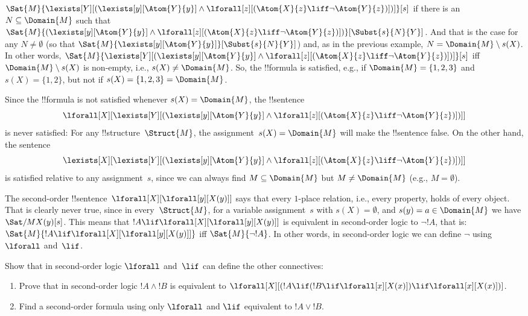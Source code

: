\documentclass[../../../include/open-logic-section]{subfiles}
\begin{document}
\begin{ex}
  $\Sat{M}{\lexists[Y][(\lexists[y][\Atom{Y}{y}] \land
  \lforall[z][(\Atom{X}{z} \liff \lnot \Atom{Y}{z})])]}[s]$ if there
  is an $N \subseteq \Domain{M}$ such that
  $\Sat{M}{(\lexists[y][\Atom{Y}{y}] \land \lforall[z][(\Atom{X}{z}
  \liff \lnot \Atom{Y}{z})])}[\Subst{s}{N}{Y}]$. And that is the case
  for any $N \neq \emptyset$ (so that
  $\Sat{M}{\lexists[y][\Atom{Y}{y}]}[\Subst{s}{N}{Y}]$) and, as in the
  previous example, $N = \Domain{M} \setminus s(X)$. In other words,
  $\Sat{M}{\lexists[Y][(\lexists[y][\Atom{Y}{y}] \land
  \lforall[z][(\Atom{X}{z} \liff \lnot \Atom{Y}{z})])]}[s]$ iff
  $\Domain{M} \setminus s(X)$ is non-empty, i.e., $s(X) \neq
  \Domain{M}$. So, the !!{formula} is satisfied, e.g., if $\Domain{M}
  = \{1, 2, 3\}$ and $s(X) = \{1, 2\}$, but not if $s(X) = \{1, 2, 3\}
  = \Domain{M}$.

  Since the !!{formula} is not satisfied whenever $s(X) = \Domain{M}$,
  the !!{sentence}
  \[
  \lforall[X][\lexists[Y][(\lexists[y][\Atom{Y}{y}] \land
      \lforall[z][(\Atom{X}{z} \liff \lnot \Atom{Y}{z})])]]
  \]
  is never satisfied: For any !!{structure}~$\Struct{M}$, the
  assignment~$s(X) = \Domain{M}$ will make the !!{sentence} false. On
  the other hand, the sentence
  \[
  \lexists[X][\lexists[Y][(\lexists[y][\Atom{Y}{y}] \land
      \lforall[z][(\Atom{X}{z} \liff \lnot \Atom{Y}{z})])]]
  \]
  is satisfied relative to any assignment~$s$, since we can always
  find $M \subseteq \Domain{M}$ but $M \neq \Domain{M}$ (e.g., $M = \emptyset$).
\end{ex}

\begin{ex}
  The second-order !!{sentence}~$\lforall[X][\lforall[y][X(y)]]$ says
  that every $1$-place relation, i.e., every property, holds of every
  object. That is clearly never true, since in every~$\Struct{M}$, for
  a variable assignment~$s$ with $s(X) = \emptyset$, and $s(y) = a \in
  \Domain{M}$ we have $\Sat/{M}{X(y)}[s]$. This means that $!A \lif
  \lforall[X][\lforall[y][X(y)]]$ is equivalent in second-order logic
  to $\lnot !A$, that is: $\Sat{M}{!A \lif
  \lforall[X][\lforall[y][X(y)]]}$ iff $\Sat{M}{\lnot !A}$. In other
  words, in second-order logic we can define $\lnot$ using $\lforall$
  and~$\lif$.
\end{ex}

\begin{prob}
  Show that in second-order logic $\lforall$ and~$\lif$ can define the other
  connectives:
  \begin{enumerate}
    \item Prove that in second-order logic $!A \land !B$ is equivalent
    to $\lforall[X][(!A \lif (!B \lif \lforall[x][X(x)])\lif
    \lforall[x][X(x)])]$.
    \item Find a second-order formula using only $\lforall$ and $\lif$
    equivalent to $!A \lor !B$.
  \end{enumerate}
\end{prob}
\end{document}
